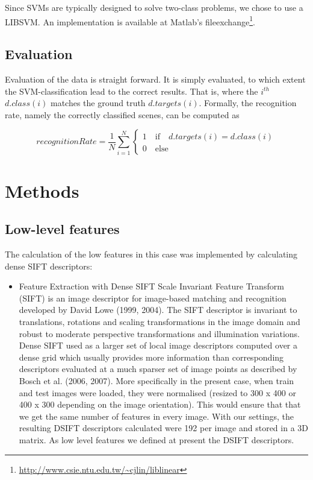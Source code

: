 \documentclass[10pt,twocolumn,letterpaper]{article}
\begin{document}
Since SVMs are typically designed to solve two-class problems, we chose to use a LIBSVM. An implementation is available at Matlab's fileexchange\footnote{\url{http://www.csie.ntu.edu.tw/~cjlin/liblinear}}. 

\subsection{Evaluation}
\label{sec:eval}
Evaluation of the data is straight forward. It is simply evaluated, to which extent the SVM-classification lead to the correct results. That is, where the $i^{th}$ $d.class(i)$ matches the ground truth $d.targets(i)$. Formally, the recognition rate, namely the correctly classified scenes, can be computed as 
\begin{small}

\begin{equation}
	recognitionRate = \frac{1}{N} \sum_{i=1}^{N} \begin{cases}
	1 \quad \text{if} \quad d.targets(i) = d.class(i)\\
	0  \quad \text{else}
	\end{cases}
\end{equation}
\end{small}




\section{Methods}

\subsection{Low-level features}
The calculation of the low features in this case  was implemented by calculating dense SIFT descriptors:
\begin{itemize}
   \item Feature Extraction with Dense SIFT \newline
   Scale Invariant Feature Transform (SIFT) is an image descriptor for image-based matching and recognition developed by David Lowe (1999, 2004). The SIFT descriptor is invariant to translations, rotations and scaling transformations in the image domain and robust to moderate perspective transformations and illumination variations.\cite{shift} Dense SIFT used as a larger set of local image descriptors computed over a dense grid which usually provides more information than corresponding descriptors evaluated at a much sparser set of image points as described by Bosch et al. (2006, 2007). More specifically in the present case, when train and test images were loaded, they were normalised (resized to 300 x 400 or 400 x 300 depending on the image orientation). This would ensure that that we get the same number of features in every image. With our settings, the resulting DSIFT descriptors calculated were 192 per image and stored in a 3D matrix. As low level features we defined at present the DSIFT descriptors.\cite{bosch}
\end{itemize}
\end{document}

